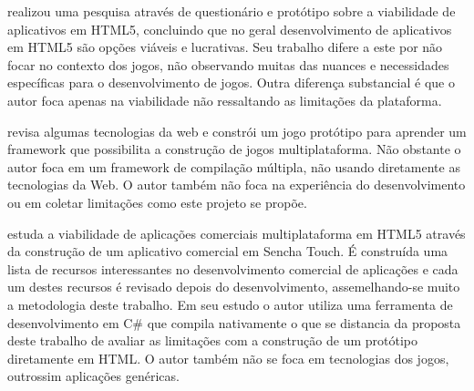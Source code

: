 \citet{aSeriousContender} realizou uma pesquisa através de questionário
e protótipo sobre a viabilidade de aplicativos em HTML5, concluindo que
no geral desenvolvimento de aplicativos em HTML5 são opções viáveis
e lucrativas. Seu trabalho difere a este por não focar no contexto dos
jogos, não observando muitas das nuances e necessidades específicas
para o desenvolvimento de jogos. Outra diferença substancial é que o
autor foca apenas na viabilidade não ressaltando as limitações da
plataforma.

\citet{crossPlatformMobileGameDevelopment} revisa algumas tecnologias
da web e constrói um jogo protótipo para aprender um framework que
possibilita a construção de jogos multiplataforma. Não obstante
o autor foca em um framework de compilação múltipla, não usando
diretamente as tecnologias da Web. O autor também não foca na experiência do
desenvolvimento ou em coletar limitações como este projeto se propõe.

\citet{viabilityBusinessApplications} estuda a viabilidade de
aplicações comerciais multiplataforma em HTML5 através da
construção de um aplicativo comercial em Sencha Touch. É construída
uma lista de recursos interessantes no desenvolvimento comercial
de aplicações e cada um destes recursos é revisado depois do
desenvolvimento, assemelhando-se muito a metodologia deste trabalho. Em
seu estudo o autor utiliza uma ferramenta de desenvolvimento em C\# que
compila nativamente o que se distancia da proposta deste trabalho de
avaliar as limitações com a construção de um protótipo diretamente
em HTML. O autor também não se foca em tecnologias dos jogos,
outrossim aplicações genéricas.


